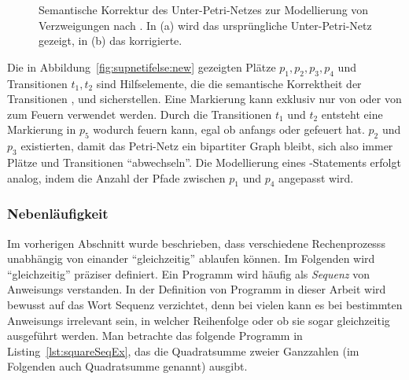 \begin{figure}
	\caption[Semantische Korrektur des Unter-Petri-Netzes zur Modellierung von Verzweigungen.]{Semantische Korrektur des Unter-Petri-Netzes zur Modellierung von Verzweigungen nach \cite[Abbildung~3.1]{Goel1990}. In (a) wird das ursprüngliche Unter-Petri-Netz gezeigt, in (b) das korrigierte.}\label{fig:supnetifelse}
\end{figure}

Die in Abbildung~\ref{fig:supnetifelse:new} gezeigten Plätze $p_1,p_2,p_3,p_4$ und Transitionen $t_1,t_2$ sind Hilfselemente, die die semantische Korrektheit der Transitionen ,  und  sicherstellen. Eine Markierung kann exklusiv nur von  oder von  zum Feuern verwendet werden. Durch die Transitionen $t_1$ und $t_2$ entsteht eine Markierung in $p_5$ wodurch  feuern kann, egal ob anfangs  oder  gefeuert hat. $p_2$ und $p_3$ existierten, damit das Petri-Netz ein bipartiter Graph bleibt, sich also immer Plätze und Transitionen \enquote{abwechseln}. Die Modellierung eines -Statements erfolgt analog, indem die Anzahl der Pfade zwischen $p_1$ und $p_4$ angepasst wird.

\subsubsection{Nebenläufigkeit}\label{sec:nebenl}
Im vorherigen Abschnitt wurde beschrieben, dass verschiedene \glspl{Rechenprozess} unabhängig von einander \enquote{gleichzeitig} ablaufen können. Im Folgenden wird \enquote{gleichzeitig} präziser definiert. Ein \gls{Programm} wird häufig als \emph{Sequenz} von \glspl{Anweisung} verstanden. In der Definition von \gls{Programm} in dieser Arbeit wird bewusst auf das Wort Sequenz verzichtet, denn bei vielen  kann es bei bestimmten \glspl{Anweisung} irrelevant sein, in welcher Reihenfolge oder ob sie sogar gleichzeitig ausgeführt werden. Man betrachte das folgende \gls{Programm} in Listing~\ref{lst:squareSeqEx}, das die Quadratsumme zweier Ganzzahlen (im Folgenden auch Quadratsumme genannt) ausgibt.


